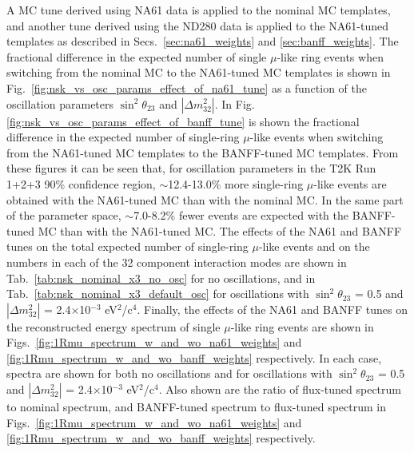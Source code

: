 A MC tune derived using NA61 data is applied to the nominal MC templates, and another tune derived using the ND280 data is 
applied to the NA61-tuned templates as described in Secs.\ \ref{sec:na61_weights} and \ref{sec:banff_weights}.
The fractional difference in the expected number of single $\mu$-like ring events when switching from the nominal MC to the
NA61-tuned MC templates is shown in Fig.\ \ref{fig:nsk_vs_osc_params_effect_of_na61_tune} as a function of the oscillation
parameters $\sin^{2}{\theta_{23}}$ and $|\Delta m^{2}_{32}|$.
In Fig. \ref{fig:nsk_vs_osc_params_effect_of_banff_tune} is shown the fractional difference in the expected number of
single-ring $\mu$-like events when switching from the NA61-tuned MC templates to the BANFF-tuned MC templates.
From these figures it can be seen that, for oscillation parameters in the T2K Run 1+2+3 90\% confidence region,
$\sim$12.4-13.0\% more single-ring $\mu$-like events are obtained with
the NA61-tuned MC than with the nominal MC.
In the same part of the parameter space, $\sim$7.0-8.2\% fewer events are expected with the BANFF-tuned MC
than with the NA61-tuned MC.
The effects of the NA61 and BANFF tunes on the total expected number of single-ring $\mu$-like events
and on the numbers in each of the 32 component interaction modes are shown in
Tab.\ \ref{tab:nsk_nominal_x3_no_osc} for no oscillations, and in
Tab.\ \ref{tab:nsk_nominal_x3_default_osc} for oscillations
with $\sin^{2}\theta_{23}$ = 0.5 and $|\Delta m^{2}_{32}|$ = 2.4$\times$10$^{-3}$ eV$^{2}$/c$^{4}$.
Finally, the effects of the NA61 and BANFF tunes on the reconstructed energy spectrum of
single $\mu$-like ring events are shown in Figs.\
\ref{fig:1Rmu_spectrum_w_and_wo_na61_weights} and
\ref{fig:1Rmu_spectrum_w_and_wo_banff_weights} respectively.
In each case, spectra are shown for both no oscillations and for
oscillations with $\sin^{2}\theta_{23}$ = 0.5 and $|\Delta m^{2}_{32}|$ = 2.4$\times$10$^{-3}$ eV$^{2}$/c$^{4}$.
Also shown are the ratio of flux-tuned spectrum to nominal spectrum, and
BANFF-tuned spectrum to flux-tuned spectrum in Figs.\
\ref{fig:1Rmu_spectrum_w_and_wo_na61_weights} and
\ref{fig:1Rmu_spectrum_w_and_wo_banff_weights} respectively.

